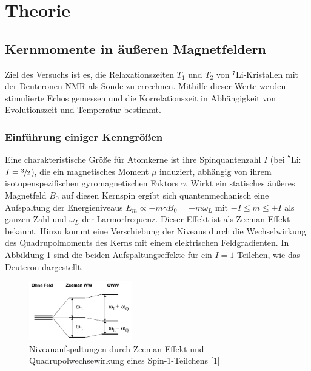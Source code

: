 
\setcounter{page}{1}
\section{Theorie}
\subsection{Kernmomente in äußeren Magnetfeldern}
Ziel des Versuchs ist es, die Relaxationszeiten $T_1$ und $T_2$ von $^7$Li-Kristallen mit der Deuteronen-NMR als Sonde zu errechnen. Mithilfe dieser Werte
werden stimulierte Echos gemessen und die Korrelationszeit in Abhängigkeit von Evolutionszeit und Temperatur bestimmt.

\subsubsection{Einführung einiger Kenngrößen}
Eine charakteristische Größe für Atomkerne ist ihre Spinquantenzahl $I$ (bei $^7$Li: $I = \sfrac32$), die ein magnetisches Moment $\mu$ induziert, abhängig von ihrem isotopenspezifischen
gyromagnetischen Faktors $\gamma$. Wirkt ein statisches äußeres Magnetfeld $B_0$ auf diesen Kernspin ergibt sich quantenmechanisch eine Aufspaltung der
Energieniveaus $E_m \propto - m \gamma B_0 = -m \omega_L $ mit $-I \leq m \leq +I$ als ganzen Zahl und $\omega_L$ der Larmorfrequenz. Dieser Effekt 
ist als Zeeman-Effekt bekannt. Hinzu kommt eine Verschiebung der Niveaus durch die Wechselwirkung des Quadrupolmoments des Kerns mit einem elektrischen 
Feldgradienten. In Abbildung \ref{pic_deuteron} sind die beiden Aufspaltungseffekte für ein $I=1$ Teilchen, wie das Deuteron dargestellt.

\begin{figure}[H]
 \includegraphics[width=0.4\textwidth]{../pics/deuteron.jpg}
 \caption{Niveauaufspaltungen durch Zeeman-Effekt und Quadrupolwechsewirkung eines Spin-1-Teilchens [1]}
 \label{pic_deuteron}
\end{figure}

